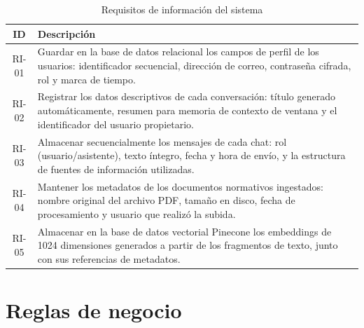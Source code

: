 \documentclass[12pt,a4paper,oneside]{report}
\begin{document}
\begin{table}[H]
    \centering
    \caption{Requisitos de información del sistema}
    \begin{tabular}{@{}cp{12cm}@{}}
        \toprule
        \textbf{ID} & \textbf{Descripción}                                                                                     \\
        \midrule
        RI-01      & Guardar en la base de datos relacional los campos de perfil de los usuarios: identificador secuencial, dirección de correo, contraseña cifrada, rol y marca de tiempo. \\
        RI-02      & Registrar los datos descriptivos de cada conversación: título generado automáticamente, resumen para memoria de contexto de ventana y el identificador del usuario propietario. \\
        RI-03      & Almacenar secuencialmente los mensajes de cada chat: rol (usuario/asistente), texto íntegro, fecha y hora de envío, y la estructura de fuentes de información utilizadas. \\
        RI-04      & Mantener los metadatos de los documentos normativos ingestados: nombre original del archivo PDF, tamaño en disco, fecha de procesamiento y usuario que realizó la subida. \\
        RI-05      & Almacenar en la base de datos vectorial Pinecone los embeddings de 1024 dimensiones generados a partir de los fragmentos de texto, junto con sus referencias de metadatos. \\
        \bottomrule
    \end{tabular}
\end{table}

\section{Reglas de negocio}
\end{document}
